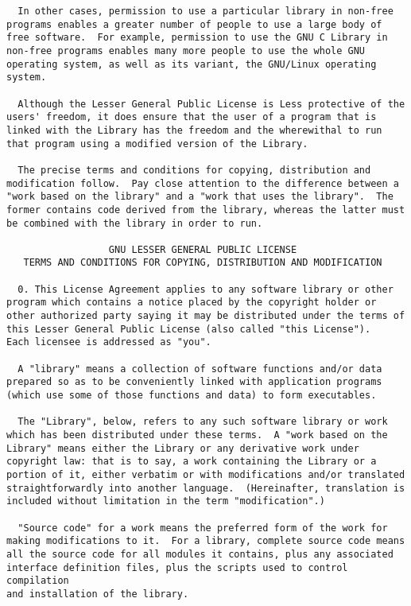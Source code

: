 \documentclass{InsightBook}
\begin{document}
\begin{verbatim}
  In other cases, permission to use a particular library in non-free
programs enables a greater number of people to use a large body of
free software.  For example, permission to use the GNU C Library in
non-free programs enables many more people to use the whole GNU
operating system, as well as its variant, the GNU/Linux operating
system.

  Although the Lesser General Public License is Less protective of the
users' freedom, it does ensure that the user of a program that is
linked with the Library has the freedom and the wherewithal to run
that program using a modified version of the Library.

  The precise terms and conditions for copying, distribution and
modification follow.  Pay close attention to the difference between a
"work based on the library" and a "work that uses the library".  The
former contains code derived from the library, whereas the latter must
be combined with the library in order to run.

                  GNU LESSER GENERAL PUBLIC LICENSE
   TERMS AND CONDITIONS FOR COPYING, DISTRIBUTION AND MODIFICATION

  0. This License Agreement applies to any software library or other
program which contains a notice placed by the copyright holder or
other authorized party saying it may be distributed under the terms of
this Lesser General Public License (also called "this License").
Each licensee is addressed as "you".

  A "library" means a collection of software functions and/or data
prepared so as to be conveniently linked with application programs
(which use some of those functions and data) to form executables.

  The "Library", below, refers to any such software library or work
which has been distributed under these terms.  A "work based on the
Library" means either the Library or any derivative work under
copyright law: that is to say, a work containing the Library or a
portion of it, either verbatim or with modifications and/or translated
straightforwardly into another language.  (Hereinafter, translation is
included without limitation in the term "modification".)

  "Source code" for a work means the preferred form of the work for
making modifications to it.  For a library, complete source code means
all the source code for all modules it contains, plus any associated
interface definition files, plus the scripts used to control compilation
and installation of the library.


\end{verbatim}
\end{document}
